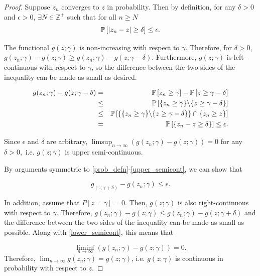 \documentclass[12pt,oneside,final]{thesis}
\begin{document}
\begin{proof}
Suppose $z_n$ converges to $z$ in probability. Then by definition, for any  $\delta>0$ and  $\epsilon>0$, $\exists	N\in\mathbb{Z^+}$ such that for all   $n \geq N$ 
$$ \mathbb{P}\left[\left|z_n-z\right| \geq \delta \right] \leq \epsilon.$$

 The functional  $g(z;\gamma)$ is  non-increasing with respect to $\gamma$. Therefore, for $\delta>0$, 
$g(z_n;\gamma) -g(z;\gamma) \geq g(z_n;\gamma) -g(z;\gamma-\delta) $. Furthermore, $g(z;\gamma)$ is left-continuous with respect to $\gamma$, so the difference between the two sides of the inequality can be made as small as desired.

\begin{eqnarray}
g(z_n;\gamma) - g(z;\gamma-\delta) & = &\mathbb{P}\left[z_n\geq \gamma \right] -\mathbb{P}\left[z \geq  \gamma - \delta \right] \label{prob_defn}\\
& \leq &  \mathbb{P}\left[\{z_n \geq \gamma \} \backslash \{z \geq \gamma - \delta \} \right] \label{set_diff}\\
& \leq & \mathbb{P}\left[\{\{z_n \geq \gamma \} \backslash \{z \geq \gamma - \delta \} \} \cap \{z_n \geq  z\} \right] \label{conjunct_with_set} \\
& =  & \mathbb{P}\left[\{z_n - z \geq \delta \} \right] \leq \epsilon. \label{upper_semicont}
\end{eqnarray}
 
Since $\epsilon$ and $\delta$ are arbitrary,
 $ \limsup_{n \rightarrow \infty} ( {g(z_n;\gamma)}- g(z;\gamma) ) =  0$ for any $\delta>0, $ i.e. $g(z;\gamma)$ is upper semi-continuous.

By arguments  symmetric to  \eqref{prob_defn}-\eqref{upper_semicont}, we can show that

\begin{equation}
g_(z;\gamma+\delta) - g(z_n;\gamma) \leq \epsilon. \label{lower_semicont}
\end{equation}


In addition, assume that  $P\left[z = \gamma \right]=0$. Then, $g(z;\gamma)$ is also right-continuous with respect to $\gamma$. Therefore, 
$g(z_n;\gamma) -g(z;\gamma) \leq g(z_n;\gamma) -g(z;\gamma+\delta)$ and the difference between the two sides of the inequality can be made as small as possible. 
Along with \eqref{lower_semicont}, this means that

 \[ 
\liminf_{n \rightarrow \infty} ( {g(z_n;\gamma)}- g(z;\gamma) ) = 0. 
\] Therefore, $\lim_{n\rightarrow \infty}g(z_n;\gamma) = g(z;\gamma)$, i.e. $g(z;\gamma)$ is continuous in probability with respect to $z$.
\end{proof}
\end{document}
